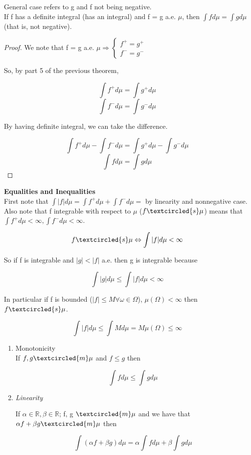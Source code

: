 \documentclass[11pt,fleqn]{book} %
\begin{document}
General case refers to g and f not being negative.\\

If f has  a definite integral (has an integral) and f = g a.e. $\mu$, then $\int f d\mu = \int g d\mu$ (that is, not negative).

\begin{proof}
	We note that f = g a.e. $\mu \Rightarrow \left\{\begin{array}{l}
		f^+ = g^+\\
		f^- = g^-
	\end{array}\right.$ 

	So, by part 5 of the previous theorem, 

			$$ \int f^+ d\mu = \int g^+ d\mu$$
			$$ \int f^- d\mu =\int g^- d\mu$$

By having definite integral, we can take the difference.

		$$ \int f^+ d\mu - \int f^- d\mu = \int g^+ d\mu  - \int g^- d\mu$$
		$$\int f d\mu = \int g d\mu$$
			 
\end{proof}


\textbf{Equalities and Inequalities}\\

First note that $\int |f| d\mu = \int f^+ d\mu + \int f^- d\mu =$ by linearity and nonnegative case. \\

Also note that f integrable with respect to $\mu$ ($f \textcircled{s} \mu$) means that $\int f^+ d\mu < \infty, \int f^- d\mu < \infty$. 

		$$f \textcircled{s} \mu \Leftrightarrow \int |f| d\mu < \infty $$

So if f is integrable and $|g| < |f|$ a.e. then g is integrable because

		$$\int |g| d\mu \leq \int |f| d\mu < \infty $$

In particular if f is bounded ($|f| \leq M \forall \omega \in \Omega$), $\mu(\Omega)< \infty$ then $f \textcircled{s} \mu$.

		$$\int |f| d\mu \leq \int M d\mu = M \mu(\Omega) \leq \infty $$

\begin{theorem}
	\begin{enumerate}
		\item Monotonicity\\

				If $f, g \textcircled{m} \mu$ and $f \leq g$ then

						$$\int f d\mu \leq \int g d\mu $$
		
		\item \textit{Linearity}

				If $\alpha \in \mathbb{R}, \beta \in \mathbb{R}$; f, g $\textcircled{m} \mu$ and we have that $\alpha f + \beta g \textcircled{m} \mu$ then

						$$\int (\alpha f + \beta g) d\mu  = \alpha \int f d\mu + \beta \int g d\mu$$ 
	\end{enumerate}
\end{theorem}
\end{document}
